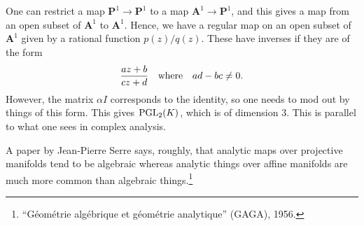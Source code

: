 \documentclass [11 pt, oneside] {article}
\begin{document}
\begin{example}\label{}
One can restrict a map $\mathbf{P}^1\longrightarrow \mathbf{P}^1$ to a map $\mathbf{A}^1\longrightarrow \mathbf{P}^1$, and this gives a map from an open subset of $\mathbf{A}^1$ to $\mathbf{A}^1$. Hence, we have a regular map on an open subset of $\mathbf{A}^1$ given by a rational function $p(z)/q (z)$. These have inverses if they are of the form
\begin{align*}
	\frac{az+b}{cz+d}\textrm{\quad where\quad$ad - bc \ne 0$.}
\end{align*}
However, the matrix $\alpha I$ corresponds to the identity, so one needs to mod out by things of this form. This gives $\operatorname{PGL}_2(K)$, which is of dimension $3$. This is parallel to what one sees in complex analysis.
\end{example}

\begin{remark}
	A paper by Jean-Pierre Serre says, roughly, that analytic maps over projective manifolds tend to be algebraic whereas analytic things over affine manifolds are much more common than algebraic things.\footnote{``G\'eom\'etrie alg\'ebrique et g\'eom\'etrie analytique'' (GAGA), 1956.}
\end{remark}
\end{document}
